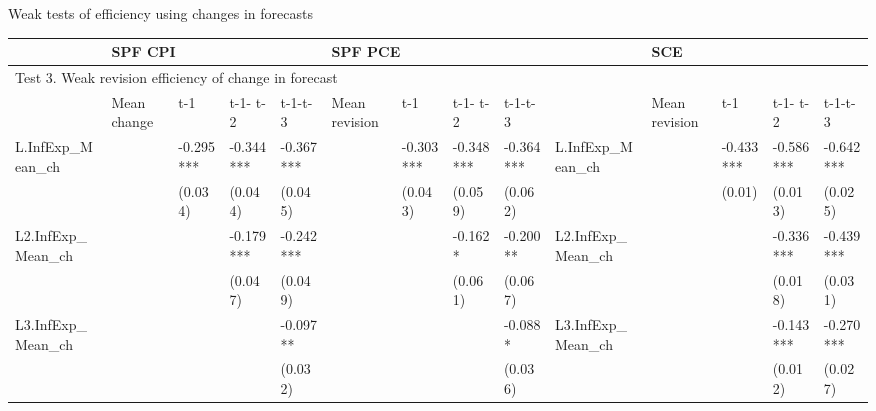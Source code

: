 \documentclass{beamer}
\begin{document}
\begin{frame}{Weak tests of efficiency using changes in forecasts }

	\begin{adjustbox}{width=\textwidth}
	\begin{threeparttable}
		\caption{Weak Tests of Revision Efficiency using Change in Forecasts and Uncertainty}
		\label{WeakRevEfficiency}
		\begin{tabular}{llllllllllllll}
			\hline 
			& \multicolumn{4}{l}{SPF CPI}                     & \multicolumn{4}{l}{SPF PCE}                       &                      & \multicolumn{4}{l}{SCE}                           \\
			\hline 
			\multicolumn{14}{l}{Test 3. Weak revision efficiency of change in forecast}                                                                                                                                    \\
			\hline 
			& Mean change & t-1       & t-1- t-2  & t-1-t-3   & Mean revision & t-1       & t-1- t-2  & t-1-t-3   &                      & Mean revision & t-1       & t-1- t-2  & t-1-t-3   \\
			\hline 
			L.InfExp\_Mean\_ch   &             & -0.295*** & -0.344*** & -0.367*** &               & -0.303*** & -0.348*** & -0.364*** & L.InfExp\_Mean\_ch  &         & -0.433*** & -0.586*** & -0.642*** \\
			&             & (0.034)   & (0.044)   & (0.045)   &               & (0.043)   & (0.059)   & (0.062)   &                    &         & (0.01)     & (0.013)    & (0.025)    \\
			
			L2.InfExp\_Mean\_ch  &             &           & -0.179*** & -0.242*** &               &           & -0.162*   & -0.200**  & L2.InfExp\_Mean\_ch &         &           & -0.336*** & -0.439*** \\
			
			&             &           & (0.047)   & (0.049)   &               &           & (0.061)   & (0.067)   &                                   &         &           & (0.018)    & (0.031)    \\
			L3.InfExp\_Mean\_ch  &             &           &           & -0.097**  &               &           &           & -0.088*   & L3.InfExp\_Mean\_ch &         &           & -0.143*** & -0.270*** \\
			
			&             &           &           & (0.032)   &               &           &           & (0.036)   &                                &         &           & (0.012)    & (0.027)    \\
			

\end{tabular}
\end{threeparttable}
\end{adjustbox}
\end{frame}
\end{document}

